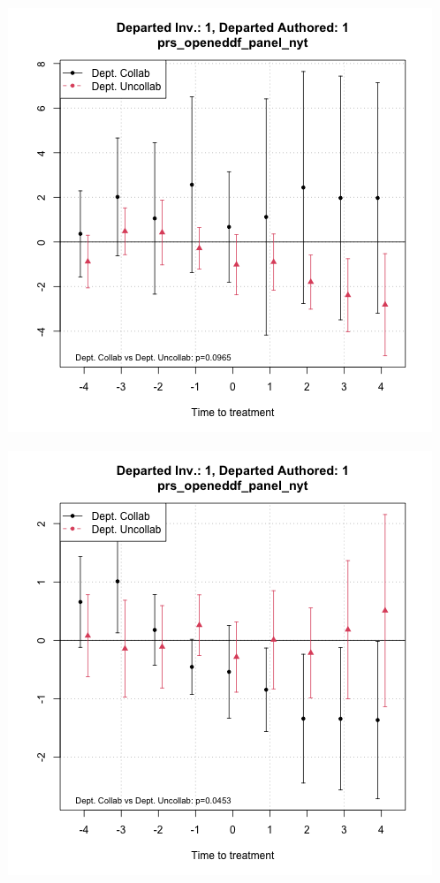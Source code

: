 \begin{figure}[htbp]
    \centering
    \begin{minipage}[b]{0.49\textwidth}
        \centering
        \includegraphics[width=\textwidth]{temp/output/collab_imp/auth1_inv1_cs_norm_prs_opened.png}
    \label{fig:prs_opened_integral}
    \end{minipage}
    \hfill
    \begin{minipage}[b]{0.49\textwidth}
        \centering
        \includegraphics[width=\textwidth]{temp/output/collab_imp/auth_n1_inv_n1_cs_norm_prs_opened.png}
    \label{fig:prs_opened_nonintegral}
    \end{minipage}


\end{figure}
